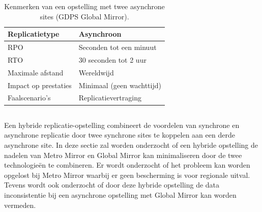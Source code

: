 \begin{table}[H]
\begin{tabular}{|l|l|}
\hline
Replicatietype       & Asynchroon                                 \\ \hline
RPO                  & Seconden tot een minuut                      \\ \hline
RTO                  & 30 seconden tot 2 uur                      \\ \hline
Maximale afstand     & Wereldwijd                                 \\ \hline
Impact op prestaties & Minimaal (geen wachttijd)                  \\ \hline
Faalscenario's       & Replicatievertraging                       \\ \hline
\end{tabular}
\caption{Kenmerken van een opstelling met twee asynchrone sites (GDPS Global Mirror).}
\end{table}

\subsection{}%
\label{sec:hybride-opstelling} 

Een hybride replicatie-opstelling combineert de voordelen van synchrone en asynchrone replicatie door twee synchrone sites te koppelen aan een derde asynchrone site.
In deze sectie zal worden onderzocht of een hybride opstelling de nadelen van Metro Mirror en Global Mirror kan minimaliseren door de twee technologieën te combineren.
Er wordt onderzocht of het probleem kan worden opgelost bij Metro Mirror waarbij er geen bescherming is voor regionale uitval.
Tevens wordt ook onderzocht of door deze hybride opstelling de data inconsistentie bij een asynchrone opstelling met Global Mirror kan worden vermeden.

\subsubsection{}
\label{sec:werking-hybride-opstelling}

